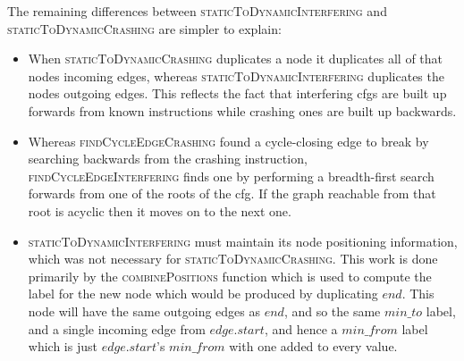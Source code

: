 The remaining differences between \textsc{staticToDynamicInterfering}
and \textsc{staticToDynamicCrashing} are simpler to explain:
\begin{itemize}
\item When \textsc{staticToDynamicCrashing} duplicates a node it
  duplicates all of that nodes incoming edges, whereas
  \textsc{staticToDynamicInterfering} duplicates the nodes outgoing
  edges.  This reflects the fact that interfering \glspl{cfg} are
  built up forwards from known instructions while crashing ones are
  built up backwards.
\item Whereas \textsc{findCycleEdgeCrashing} found a cycle-closing
  edge to break by searching backwards from the crashing instruction,
  \textsc{findCycleEdgeInterfering} finds one by performing a
  breadth-first search forwards from one of the roots of the
  \gls{cfg}.  If the graph reachable from that root is acyclic then it
  moves on to the next one.
\item \textsc{staticToDynamicInterfering} must maintain its node
  positioning information, which was not necessary for
  \textsc{staticToDynamicCrashing}.  This work is done primarily by
  the \textsc{combinePositions} function which is used to compute the
  label for the new node which would be produced by duplicating
  $\mathit{end}$.  This node will have the same outgoing edges as
  $\mathit{end}$, and so the same $min\_to$ label, and a single
  incoming edge from $\mathit{edge}.\mathit{start}$, and hence a
  $\mathit{min\_from}$ label which is just
  $\mathit{edge}.\mathit{start}$'s $\mathit{min\_from}$ with one added
  to every value.
\end{itemize}

\newcommand{\shortrightarrow}{\begin{tikzpicture}[baseline= -1ex*.75]
    \draw[->] (0,0) -- ++(.25,0);
  \end{tikzpicture}
  \hspace{-1pt}
}

